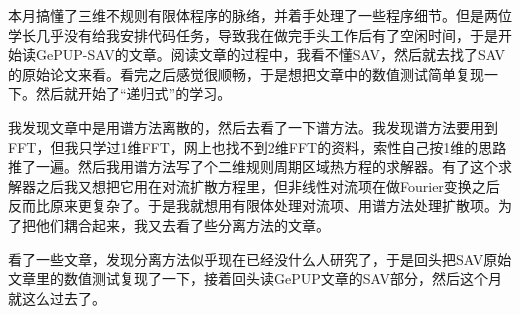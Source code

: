 \documentclass[lang=cn,10pt,bibend=bibtex]{elegantbook}
\begin{document}
本月搞懂了三维不规则有限体程序的脉络，并着手处理了一些程序细节。但是两位学长几乎没有给我安排代码任务，导致我在做完手头工作后有了空闲时间，于是开始读GePUP-SAV的文章。阅读文章的过程中，我看不懂SAV，然后就去找了SAV的原始论文来看。看完之后感觉很顺畅，于是想把文章中的数值测试简单复现一下。然后就开始了“递归式”的学习。

我发现文章中是用谱方法离散的，然后去看了一下谱方法。我发现谱方法要用到FFT，但我只学过1维FFT，网上也找不到2维FFT的资料，索性自己按1维的思路推了一遍。然后我用谱方法写了个二维规则周期区域热方程的求解器。有了这个求解器之后我又想把它用在对流扩散方程里，但非线性对流项在做Fourier变换之后反而比原来更复杂了。于是我就想用有限体处理对流项、用谱方法处理扩散项。为了把他们耦合起来，我又去看了些分离方法的文章。

看了一些文章，发现分离方法似乎现在已经没什么人研究了，于是回头把SAV原始文章里的数值测试复现了一下，接着回头读GePUP文章的SAV部分，然后这个月就这么过去了。
\end{document}
